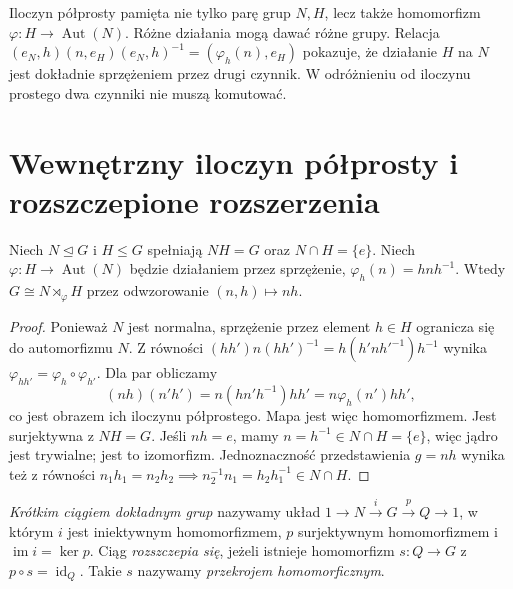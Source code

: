\begin{uwaga}
Iloczyn półprosty pamięta nie tylko parę grup $N,H$,
lecz także homomorfizm $\varphi:H\to\operatorname{Aut}(N)$.
Różne działania mogą dawać różne grupy.
Relacja
$(e_N,h)(n,e_H)(e_N,h)^{-1}=(\varphi_h(n),e_H)$
pokazuje, że działanie $H$ na $N$ jest dokładnie
sprzężeniem przez drugi czynnik.
W odróżnieniu od iloczynu prostego dwa czynniki nie muszą komutować.
\end{uwaga}

\section{Wewnętrzny iloczyn półprosty i rozszczepione rozszerzenia}
\begin{twierdzenie}
\label{aa:tw:internal-semidirect}
Niech $N\trianglelefteq G$ i $H\le G$ spełniają
$NH=G$ oraz $N\cap H=\{e\}$.
Niech $\varphi:H\to\operatorname{Aut}(N)$ będzie działaniem
przez sprzężenie, $\varphi_h(n)=hnh^{-1}$.
Wtedy $G\cong N\rtimes_\varphi H$ przez odwzorowanie
$(n,h)\mapsto nh$.
\end{twierdzenie}
\begin{proof}
Ponieważ $N$ jest normalna, sprzężenie przez element $h\in H$
ogranicza się do automorfizmu $N$.
Z równości $(hh')n(hh')^{-1}=h(h'nh'^{-1})h^{-1}$
wynika $\varphi_{hh'}=\varphi_h\circ\varphi_{h'}$.
Dla par obliczamy
\[
 (nh)(n'h')=n(hn'h^{-1})hh'=
 n\varphi_h(n')hh',
\]
co jest obrazem ich iloczynu półprostego. Mapa jest więc
homomorfizmem. Jest surjektywna z $NH=G$.
Jeśli $nh=e$, mamy $n=h^{-1}\in N\cap H=\{e\}$,
więc jądro jest trywialne; jest to izomorfizm.
Jednoznaczność przedstawienia $g=nh$ wynika też z równości
$n_1h_1=n_2h_2\implies n_2^{-1}n_1=h_2h_1^{-1}\in N\cap H$.
\end{proof}

\begin{definicja}
\label{aa:def:split-exact}
\emph{Krótkim ciągiem dokładnym grup} nazywamy układ
$1\longrightarrow N\xrightarrow{i}G\xrightarrow{p}Q\longrightarrow1$,
w którym $i$ jest iniektywnym homomorfizmem, $p$ surjektywnym
homomorfizmem i $\operatorname{im}i=\ker p$.
Ciąg \emph{rozszczepia się}, jeżeli istnieje homomorfizm
$s:Q\to G$ z $p\circ s=\operatorname{id}_Q$.
Takie $s$ nazywamy \emph{przekrojem homomorficznym}.
\end{definicja}

